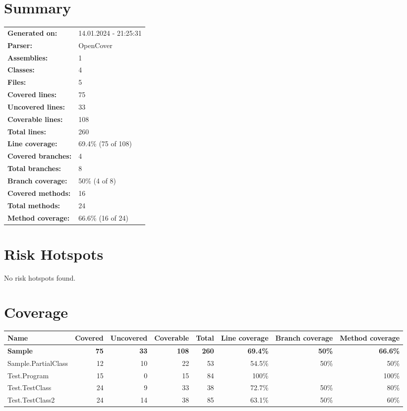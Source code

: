 \documentclass[a4paper,landscape,10pt]{article}
\begin{document}
\setcounter{secnumdepth}{-1}
\section{Summary}
\begin{longtable}[l]{ll}
\textbf{Generated on:} & 14.01.2024 - 21:25:31\\
\textbf{Parser:} & OpenCover\\
\textbf{Assemblies:} & 1\\
\textbf{Classes:} & 4\\
\textbf{Files:} & 5\\
\textbf{Covered lines:} & 75\\
\textbf{Uncovered lines:} & 33\\
\textbf{Coverable lines:} & 108\\
\textbf{Total lines:} & 260\\
\textbf{Line coverage:} & 69.4\% (75 of 108)\\
\textbf{Covered branches:} & 4\\
\textbf{Total branches:} & 8\\
\textbf{Branch coverage:} & 50\% (4 of 8)\\
\textbf{Covered methods:} & 16\\
\textbf{Total methods:} & 24\\
\textbf{Method coverage:} & 66.6\% (16 of 24)\\
\end{longtable}
\section{Risk Hotspots}
No risk hotspots found.
\section{Coverage}
\begin{longtable}[l]{|l|r|r|r|r|r|r|r|}
\hline
\textbf{Name} & \textbf{Covered} & \textbf{Uncovered} & \textbf{Coverable} & \textbf{Total} & \textbf{Line coverage} & \textbf{Branch coverage} & \textbf{Method coverage}\\
\hline
\textbf{Sample} & \textbf{75} & \textbf{33} & \textbf{108} & \textbf{260} & \textbf{69.4\%} & \textbf{50\%} & \textbf{66.6\%}\\
\hline
Sample.PartialClass & 12 & 10 & 22 & 53 & 54.5\% & 50\% & 50\%\\
\hline
Test.Program & 15 & 0 & 15 & 84 & 100\% &  & 100\%\\
\hline
Test.TestClass & 24 & 9 & 33 & 38 & 72.7\% & 50\% & 80\%\\
\hline
Test.TestClass2 & 24 & 14 & 38 & 85 & 63.1\% & 50\% & 60\%\\
\hline
\end{longtable}
\newpage
\end{document}
